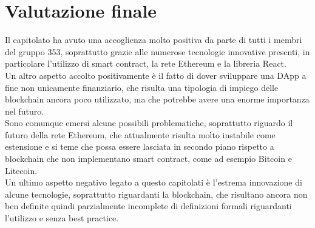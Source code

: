 \documentclass[main.tex]{subfiles}
\begin{document}
\section{Valutazione finale}
Il capitolato ha avuto una accoglienza molto positiva da parte di tutti i membri del gruppo 353, soprattutto grazie alle numerose tecnologie innovative presenti, in particolare l'utilizzo di smart contract, la rete Ethereum e la libreria React.\\
Un altro aspetto accolto positivamente è il fatto di dover sviluppare una DApp a fine non unicamente finanziario, che risulta una tipologia di impiego delle blockchain ancora poco utilizzato, ma che potrebbe avere una enorme importanza nel futuro.\\
Sono comunque emersi alcune possibili problematiche, soprattutto riguardo il futuro della rete Ethereum, che attualmente risulta molto instabile come estensione e si teme che possa essere lasciata in secondo piano rispetto a blockchain che non implementano smart contract, come ad esempio Bitcoin e Litecoin.\\
Un ultimo aspetto negativo legato a questo capitolati è l'estrema innovazione di alcune tecnologie, soprattutto riguardanti la blockchain, che risultano ancora non ben definite quindi parzialmente incomplete di definizioni formali riguardanti l'utilizzo e senza best practice.
\end{document}
